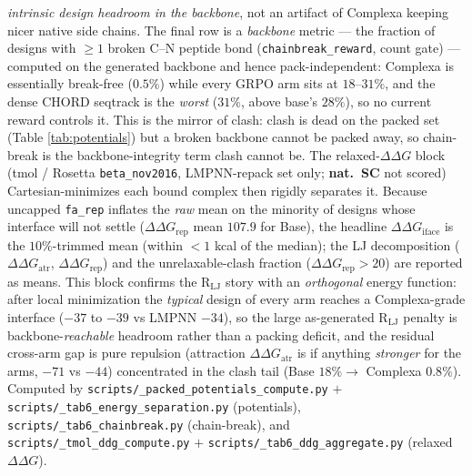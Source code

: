 \documentclass[11pt]{article}
\newcommand{\R}{\mathrm{R}}
\newcommand{\ttk}[1]{\texttt{\small #1}}
\begin{document}
\begin{table}[htbp]
{\emph{intrinsic design headroom in the backbone}, not an artifact of Complexa keeping nicer native
side chains. The final row is a \emph{backbone} metric --- the fraction of designs with $\ge\!1$
broken C--N peptide bond (\ttk{chainbreak\_reward}, count gate) --- computed on the generated
backbone and hence pack-independent: Complexa is essentially break-free ($0.5\%$) while every GRPO
arm sits at $18\text{--}31\%$, and the dense CHORD seqtrack is the \emph{worst} ($31\%$, above base's
$28\%$), so no current reward controls it. This is the mirror of clash: clash is dead on the packed
set (Table \ref{tab:potentials}) but a broken backbone cannot be packed away, so chain-break is the
backbone-integrity term clash cannot be. The relaxed-$\Delta\Delta G$ block (tmol / Rosetta
\ttk{beta\_nov2016}, LMPNN-repack set only; \textbf{nat.\ SC} not scored) Cartesian-minimizes each
bound complex then rigidly separates it. Because uncapped \ttk{fa\_rep} inflates the \emph{raw} mean
on the minority of designs whose interface will not settle ($\Delta\Delta G_{\mathrm{rep}}$ mean
$107.9$ for Base), the headline $\Delta\Delta G_{\mathrm{iface}}$ is the $10\%$-trimmed mean (within
$<\!1$ kcal of the median); the LJ decomposition ($\Delta\Delta G_{\mathrm{atr}}$,
$\Delta\Delta G_{\mathrm{rep}}$) and the unrelaxable-clash fraction ($\Delta\Delta G_{\mathrm{rep}}\!>\!20$)
are reported as means. This block confirms the $\R_{\mathrm{LJ}}$ story with an \emph{orthogonal}
energy function: after local minimization the \emph{typical} design of every arm reaches a
Complexa-grade interface ($-37$ to $-39$ vs LMPNN $-34$), so the large as-generated $\R_{\mathrm{LJ}}$
penalty is backbone-\emph{reachable} headroom rather than a packing deficit, and the residual
cross-arm gap is pure repulsion (attraction $\Delta\Delta G_{\mathrm{atr}}$ is if anything
\emph{stronger} for the arms, $-71$ vs $-44$) concentrated in the clash tail (Base $18\%\!\to\!$
Complexa $0.8\%$). Computed by \ttk{scripts/\_packed\_potentials\_compute.py}
$+$ \ttk{scripts/\_tab6\_energy\_separation.py} (potentials), \ttk{scripts/\_tab6\_chainbreak.py}
(chain-break), and \ttk{scripts/\_tmol\_ddg\_compute.py} $+$ \ttk{scripts/\_tab6\_ddg\_aggregate.py}
(relaxed $\Delta\Delta G$).}
\label{tab:crossarmpot}
\end{table}
\end{document}
